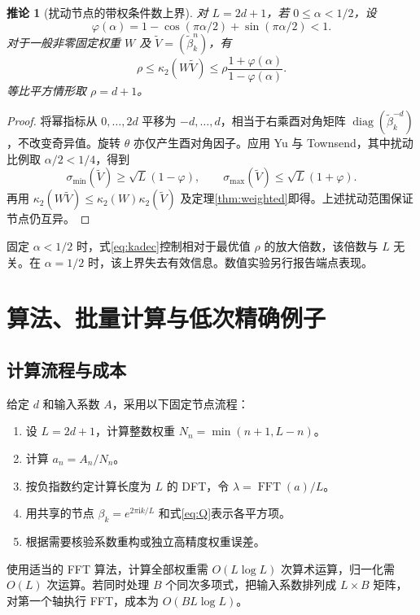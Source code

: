 \documentclass[UTF8,a4paper,zihao=-4,fontset=windows]{ctexart}
\theoremstyle{chinese}
\newtheorem{corollary}[theorem]{推论}
\numberwithin{equation}{section}
\newcommand{\diag}{\operatorname{diag}}
\newcommand{\cond}{\kappa_2}
\begin{document}
\begin{corollary}[扰动节点的带权条件数上界]\label{cor:kadec}
对 $L=2d+1$，若 $0\le\alpha<1/2$，设
\[
\varphi(\alpha)=1-\cos(\pi\alpha/2)+\sin(\pi\alpha/2)<1.
\]
对于一般非零固定权重 $W$ 及 $\widetilde V=(\widetilde\beta_k^n)$，有
\begin{equation}\label{eq:kadec}
\rho\le\cond(W\widetilde V)
\le\rho\frac{1+\varphi(\alpha)}{1-\varphi(\alpha)}.
\end{equation}
等比平方情形取 $\rho=d+1$。
\end{corollary}
\begin{proof}
将幂指标从 $0,\ldots,2d$ 平移为 $-d,\ldots,d$，相当于右乘酉对角矩阵 $\diag(\widetilde\beta_k^{-d})$，不改变奇异值。旋转 $\theta$ 亦仅产生酉对角因子。应用 Yu 与 Townsend\cite[Theorem 2.1, Corollary 2.3]{yu}，其中扰动比例取 $\alpha/2<1/4$，得到
\[
\sigma_{\min}(\widetilde V)\ge\sqrt L(1-\varphi),\qquad
\sigma_{\max}(\widetilde V)\le\sqrt L(1+\varphi).
\]
再用 $\cond(W\widetilde V)\le\cond(W)\cond(\widetilde V)$ 及定理\ref{thm:weighted}即得。上述扰动范围保证节点仍互异。
\end{proof}

固定 $\alpha<1/2$ 时，式\eqref{eq:kadec}控制相对于最优值 $\rho$ 的放大倍数，该倍数与 $L$ 无关。在 $\alpha=1/2$ 时，该上界失去有效信息。数值实验另行报告端点表现。

\section{算法、批量计算与低次精确例子}
\subsection{计算流程与成本}
给定 $d$ 和输入系数 $A$，采用以下固定节点流程：
\begin{enumerate}
\item 设 $L=2d+1$，计算整数权重 $N_n=\min(n+1,L-n)$。
\item 计算 $a_n=A_n/N_n$。
\item 按负指数约定计算长度为 $L$ 的 DFT，令 $\lambda=\operatorname{FFT}(a)/L$。
\item 用共享的节点 $\beta_k=e^{2\pi\mathrm ik/L}$ 和式\eqref{eq:Q}表示各平方项。
\item 根据需要核验系数重构或独立高精度权重误差。
\end{enumerate}
使用适当的 FFT 算法，计算全部权重需 $O(L\log L)$ 次算术运算，归一化需 $O(L)$ 次运算。若同时处理 $B$ 个同次多项式，把输入系数排列成 $L\times B$ 矩阵，对第一个轴执行 FFT，成本为 $O(BL\log L)$。
\end{document}
